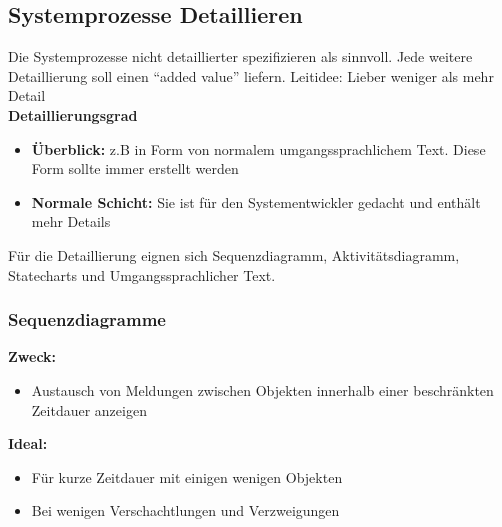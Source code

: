 \subsection{Systemprozesse Detaillieren }
Die Systemprozesse nicht detaillierter spezifizieren als sinnvoll. Jede weitere Detaillierung soll einen "`added value"' liefern. 
Leitidee: Lieber weniger als mehr Detail\\

\textbf{Detaillierungsgrad}
\begin{itemize}
	\item \textbf{Überblick: } z.B in Form von normalem umgangssprachlichem Text. Diese Form sollte immer erstellt werden
	\item \textbf{Normale Schicht: } Sie ist für den Systementwickler gedacht und enthält mehr Details  
\end{itemize}

Für die Detaillierung eignen sich Sequenzdiagramm, Aktivitätsdiagramm, Statecharts und Umgangssprachlicher Text.

\subsubsection{Sequenzdiagramme }

\begin{multicols}{2}
	\textbf{Zweck:}
	\begin{itemize}
		\item Austausch von Meldungen zwischen Objekten innerhalb einer beschränkten Zeitdauer anzeigen
	\end{itemize}
	\columnbreak
	
	\textbf{Ideal:}
	\begin{itemize}
		\item Für kurze Zeitdauer mit einigen wenigen Objekten
		\item Bei wenigen Verschachtlungen und Verzweigungen
	\end{itemize}
\end{multicols}

